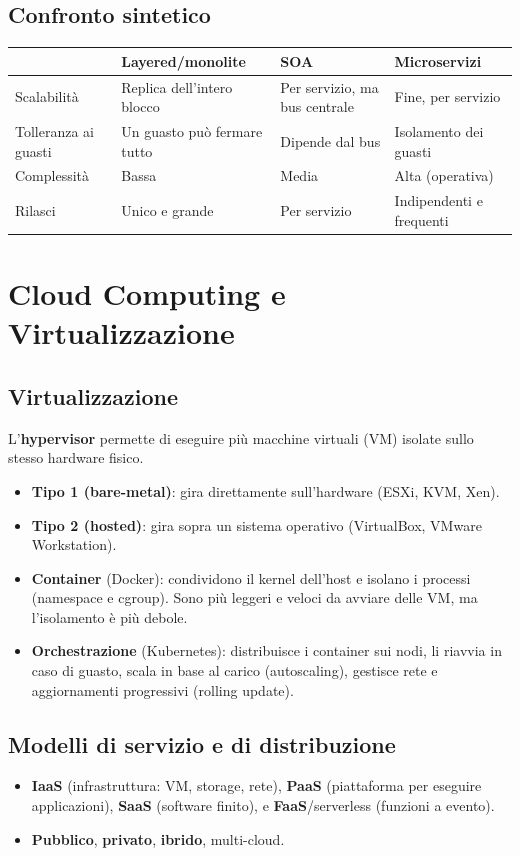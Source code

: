 \subsection{Confronto sintetico}
\begin{center}
\begin{tabularx}{\textwidth}{@{}lXXX@{}}
\toprule
 & \textbf{Layered/monolite} & \textbf{SOA} & \textbf{Microservizi} \\
\midrule
Scalabilità & Replica dell'intero blocco & Per servizio, ma bus centrale & Fine, per servizio \\
Tolleranza ai guasti & Un guasto può fermare tutto & Dipende dal bus & Isolamento dei guasti \\
Complessità & Bassa & Media & Alta (operativa) \\
Rilasci & Unico e grande & Per servizio & Indipendenti e frequenti \\
\bottomrule
\end{tabularx}
\end{center}

\section{Cloud Computing e Virtualizzazione}

\subsection{Virtualizzazione}
L'\textbf{hypervisor} permette di eseguire più macchine virtuali (VM) isolate sullo stesso hardware fisico.
\begin{itemize}
    \item \textbf{Tipo 1 (bare-metal)}: gira direttamente sull'hardware (ESXi, KVM, Xen).
    \item \textbf{Tipo 2 (hosted)}: gira sopra un sistema operativo (VirtualBox, VMware Workstation).
    \item \textbf{Container} (Docker): condividono il kernel dell'host e isolano i processi (namespace e cgroup). Sono più leggeri e veloci da avviare delle VM, ma l'isolamento è più debole.
    \item \textbf{Orchestrazione} (Kubernetes): distribuisce i container sui nodi, li riavvia in caso di guasto, scala in base al carico (autoscaling), gestisce rete e aggiornamenti progressivi (rolling update).
\end{itemize}

\subsection{Modelli di servizio e di distribuzione}
\begin{itemize}
    \item \textbf{IaaS} (infrastruttura: VM, storage, rete), \textbf{PaaS} (piattaforma per eseguire applicazioni), \textbf{SaaS} (software finito), e \textbf{FaaS}/serverless (funzioni a evento).
    \item \textbf{Pubblico}, \textbf{privato}, \textbf{ibrido}, multi-cloud.
\end{itemize}

